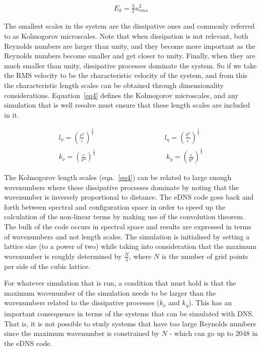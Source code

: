 \documentclass[a4paper,12pt]{article}
\begin{document}
\begin{align}
 E_k=\frac{3}{2}u_{rms}^2 \nonumber
\end{align}

The smallest scales in the system are the dissipative ones and commonly referred to as Kolmogorov microscales. Note that when dissipation is not relevant, both Reynolds numbers are larger than unity, and they become more important as the Reynolds numbers become smaller and get closer to unity. Finally, when they are much smaller than unity, dissipative processes dominate the system. So if we take the RMS velocity to be the characteristic velocity of the system, and from this the characteristic length scales can be obtained through dimensionality considerations. Equation~\ref{eq4} defines the Kolmogorov microscales, and any simulation that is well resolve must ensure that these length scales are included in it. 

\begin{align}
 l_\nu = \left( \frac{\nu^3}{\varepsilon} \right)^{\frac{1}{4}} \qquad \qquad \qquad \qquad \qquad l_\eta = \left( \frac{\eta^3}{\varepsilon} \right)^{\frac{1}{4}}
 \label{eq4}\\
 k_\nu = \left( \frac{\varepsilon}{\nu^3} \right)^{\frac{1}{4}} \qquad \qquad \qquad \qquad \qquad k_\eta = \left( \frac{\varepsilon}{\eta^3} \right)^{\frac{1}{4}} \label{eq5}
\end{align}

The Kolmogorov length scales (eqn.~\ref{eq4}) can be related to large enough wavenumbers where these dissipative processes dominate by noting that the wavenumber is inversely proportional to distance. The eDNS code goes back and forth between spectral and configuration space in order to speed up the calculation of the non-linear terms by making use of the convolution theorem. The bulk of the code occurs in spectral space and results are expressed in terms of wavenumbers and not length scales. The simulation is initialised by setting a lattice size (to a power of two) while taking into consideration that the maximum wavenumber is roughly determined by $\frac{N}{3}$, where $N$ is the number of grid points per side of the cubic lattice. 

For whatever simulation that is run, a condition that must hold is that the maximum wavenumber of the simulation needs to be larger than the wavenumbers related to the dissipative processes ($k_\nu$ and $k_\eta$). This has an important consequence in terms of the systems that can be simulated with DNS. That is, it is not possible to study systems that have too large Reynolds numbers since the maximum wavenumber is constrained by $N$ - which can go up to 2048 in the eDNS code.
\end{document}

